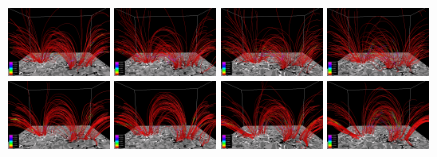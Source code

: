 \documentclass{aa}
\begin{document}
{\begin{figure}[!h]
\begin{center}
\includegraphics[width=0.24\textwidth]{figures2/TR_tracks_fieldlines_advection_c4_0030.pdf}
\includegraphics[width=0.24\textwidth]{figures2/TR_tracks_fieldlines_advection_c4_0060.pdf}
\includegraphics[width=0.24\textwidth]{figures2/TR_tracks_fieldlines_advection_c4_0090.pdf}
\includegraphics[width=0.24\textwidth]{figures2/TR_tracks_fieldlines_advection_c4_0120.pdf}
\includegraphics[width=0.24\textwidth]{figures2/TR_tracks_fieldlines_corks_c4_0030.pdf}
\includegraphics[width=0.24\textwidth]{figures2/TR_tracks_fieldlines_corks_c4_0060.pdf}
\includegraphics[width=0.24\textwidth]{figures2/TR_tracks_fieldlines_corks_c4_0090.pdf}
\includegraphics[width=0.24\textwidth]{figures2/TR_tracks_fieldlines_corks_c4_0120.pdf}

\end{center}
\end{figure}}
\end{document}
